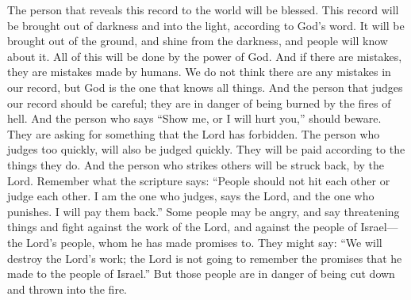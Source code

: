 The person that reveals this record to the world will be blessed. This record will be brought out of darkness and into the light, according to God's word. It will be brought out of the ground, and shine from the darkness, and people will know about it. All of this will be done by the power of God.
\bverse \iffalse And if there be faults they be the faults of a man. But behold, we know no fault; nevertheless God knoweth all things; therefore, he that condemneth, let him be aware lest he shall be in danger of hell fire. \fi
And if there are mistakes, they are mistakes made by humans. We do not think there are any mistakes in our record, but God is the one that knows all things. And the person that judges our record should be careful; they are in danger of being burned by the fires of hell.
\bverse \iffalse And he that saith: Show unto me, or ye shall be smitten--let him beware lest he commandeth that which is forbidden of the Lord. \fi
And the person who says ``Show me, or I will hurt you,'' should beware. They are asking for something that the Lord has forbidden.
\bverse \iffalse For behold, the same that judgeth rashly shall be judged rashly again; for according to his works shall his wages be; therefore, he that smiteth shall be smitten again, of the Lord. \fi
The person who judges too quickly, will also be judged quickly. They will be paid according to the things they do. And the person who strikes others will be struck back, by the Lord.
\bverse \iffalse Behold what the scripture says--man shall not smite, neither shall he judge; for judgment is mine, saith the Lord, and vengeance is mine also, and I will repay. \fi
Remember what the scripture says: ``People should not hit each other or judge each other. I am the one who judges, says the Lord, and the one who punishes. I will pay them back.''
\bverse \iffalse And he that shall breathe out wrath and strifes against the work of the Lord, and against the covenant people of the Lord who are the house of Israel, and shall say: We will destroy the work of the Lord, and the Lord will not remember his covenant which he hath made unto the house of Israel--the same is in danger to be hewn down and cast into the fire; \fi
Some people may be angry, and say threatening things and fight against the work of the Lord, and against the people of Israel---the Lord's people, whom he has made promises to. They might say: ``We will destroy the Lord's work; the Lord is not going to remember the promises that he made to the people of Israel.'' But those people are in danger of being cut down and thrown into the fire.
